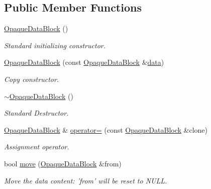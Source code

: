 \subsection*{Public Member Functions}
\begin{DoxyCompactItemize}
\item 
\hyperlink{class_d_d4hep_1_1_opaque_data_block_a1c0cf067c26869fcb636fbfed8002c73}{OpaqueDataBlock} ()
\begin{DoxyCompactList}\small\item\em Standard initializing constructor. \item\end{DoxyCompactList}\item 
\hyperlink{class_d_d4hep_1_1_opaque_data_block_a5c97af2f7c4130d78158040c2a95ab34}{OpaqueDataBlock} (const \hyperlink{class_d_d4hep_1_1_opaque_data_block}{OpaqueDataBlock} \&\hyperlink{class_d_d4hep_1_1_opaque_data_block_ab598893c35f36d91467423c37a28984e}{data})
\begin{DoxyCompactList}\small\item\em Copy constructor. \item\end{DoxyCompactList}\item 
\hyperlink{class_d_d4hep_1_1_opaque_data_block_a175f12bf6af71e59c1334cbb4099b4b3}{$\sim$OpaqueDataBlock} ()
\begin{DoxyCompactList}\small\item\em Standard Destructor. \item\end{DoxyCompactList}\item 
\hyperlink{class_d_d4hep_1_1_opaque_data_block}{OpaqueDataBlock} \& \hyperlink{class_d_d4hep_1_1_opaque_data_block_a9fa632b86dc6203b7077c9f09cb23853}{operator=} (const \hyperlink{class_d_d4hep_1_1_opaque_data_block}{OpaqueDataBlock} \&clone)
\begin{DoxyCompactList}\small\item\em Assignment operator. \item\end{DoxyCompactList}\item 
bool \hyperlink{class_d_d4hep_1_1_opaque_data_block_a488c26189a1d06ed642a335be951af7b}{move} (\hyperlink{class_d_d4hep_1_1_opaque_data_block}{OpaqueDataBlock} \&from)
\begin{DoxyCompactList}\small\item\em Move the data content: 'from' will be reset to NULL. \item\end{DoxyCompactList}\item 

\end{DoxyCompactItemize}
